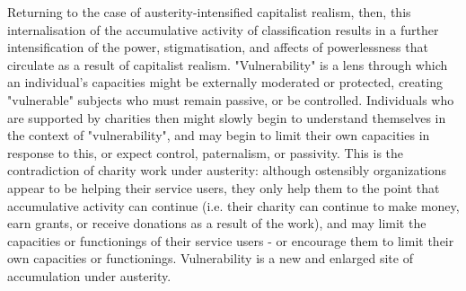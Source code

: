 Returning to the case of austerity-intensified capitalist realism, then, this internalisation of the accumulative activity of classification results in a further intensification of the power, stigmatisation, and affects of powerlessness that circulate as a result of capitalist realism. "Vulnerability" is a lens through which an individual's capacities might be externally moderated or protected, creating "vulnerable" subjects who must remain passive, or be controlled. Individuals who are supported by charities then might slowly begin to understand themselves in the context of "vulnerability", and may begin to limit their own capacities in response to this, or expect control, paternalism, or passivity. This is the contradiction of charity work under austerity: although ostensibly organizations appear to be helping their service users, they only help them to the point that accumulative activity can continue (i.e. their charity can continue to make money, earn grants, or receive donations as a result of the work), and may limit the capacities or functionings of their service users - or encourage them to limit their own capacities or functionings. Vulnerability is a new and enlarged site of accumulation under austerity.

